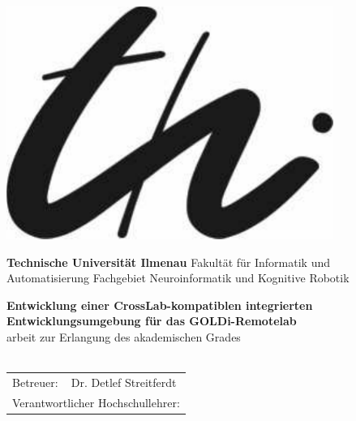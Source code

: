 
\begin{titlepage}
	\hspace{0.2cm}
	\begin{minipage}{3.5cm}
		\includegraphics[width=0.8\textwidth]{images/logo}
	\end{minipage}
	\hspace{0.2cm}
	\begin{minipage}{11cm}
		\vspace{0.7cm}
		\large
		{\bf Technische Universität Ilmenau}\newline
		Fakultät für Informatik und Automatisierung\newline
		Fachgebiet Neuroinformatik und Kognitive Robotik
	\end{minipage}
	\begin{center}
		\vspace{0.8cm}
		{\Large\bfseries Entwicklung einer CrossLab-kompatiblen integrierten Entwicklungsumgebung für das GOLDi-Remotelab\\}
		\vspace{0.8cm}
		\settingsDegree arbeit zur Erlangung des akademischen Grades \settingsDegreeName\\[0.5cm]
		{\Large \bfseries \settingsName\\[1.0cm]}
		\begin{table}[ht]
			\centering
			\begin{tabular}{ll}
				Betreuer: & Dr. Detlef Streitferdt                    \\[2mm]
				\multicolumn{2}{l}{Verantwortlicher Hochschullehrer:} \\

\end{tabular}
\end{table}
\end{center}
\end{titlepage}
